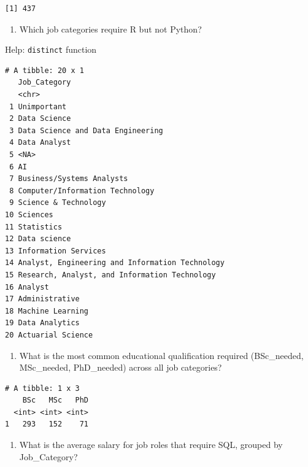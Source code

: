 \documentclass[
  letterpaper,
  DIV=11,
  numbers=noendperiod]{scrreprt}
\providecommand{\tightlist}{%
  \setlength{\itemsep}{0pt}\setlength{\parskip}{0pt}}\usepackage{longtable,booktabs,array}
\begin{document}
\begin{verbatim}
[1] 437
\end{verbatim}

\begin{enumerate}
\def\labelenumi{\arabic{enumi}.}
\setcounter{enumi}{1}
\tightlist
\item
  Which job categories require R but not Python?
\end{enumerate}

Help: \texttt{distinct} function

\begin{verbatim}
# A tibble: 20 x 1
   Job_Category                                   
   <chr>                                          
 1 Unimportant                                    
 2 Data Science                                   
 3 Data Science and Data Engineering              
 4 Data Analyst                                   
 5 <NA>                                           
 6 AI                                             
 7 Business/Systems Analysts                      
 8 Computer/Information Technology                
 9 Science & Technology                           
10 Sciences                                       
11 Statistics                                     
12 Data science                                   
13 Information Services                           
14 Analyst, Engineering and Information Technology
15 Research, Analyst, and Information Technology  
16 Analyst                                        
17 Administrative                                 
18 Machine Learning                               
19 Data Analytics                                 
20 Actuarial Science                              
\end{verbatim}

\begin{enumerate}
\def\labelenumi{\arabic{enumi}.}
\setcounter{enumi}{2}
\tightlist
\item
  What is the most common educational qualification required
  (BSc\_needed, MSc\_needed, PhD\_needed) across all job categories?
\end{enumerate}

\begin{verbatim}
# A tibble: 1 x 3
    BSc   MSc   PhD
  <int> <int> <int>
1   293   152    71
\end{verbatim}

\begin{enumerate}
\def\labelenumi{\arabic{enumi}.}
\setcounter{enumi}{3}
\tightlist
\item
  What is the average salary for job roles that require SQL, grouped by
  Job\_Category?
\end{enumerate}
\end{document}
